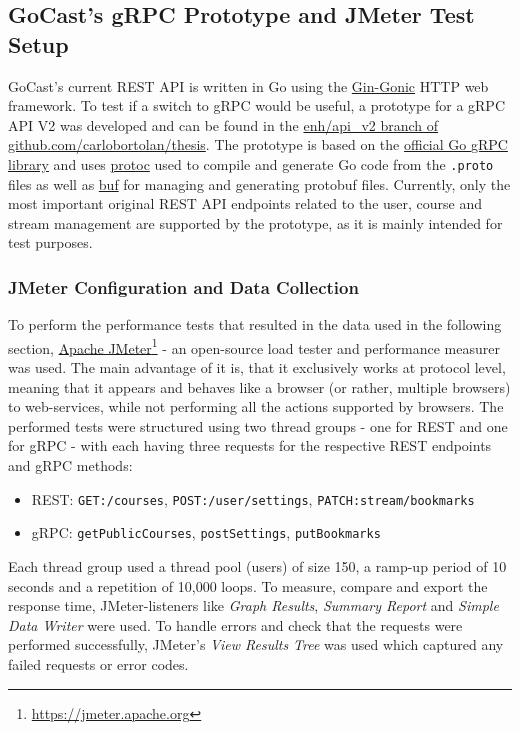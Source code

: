 \subsection{GoCast's gRPC Prototype and JMeter Test Setup}

GoCast's current \ac{REST} \ac{API} is written in Go using the \href{https://github.com/gin-gonic/gin}{Gin-Gonic} HTTP web framework. To test if a switch to \ac{gRPC} would be useful, a prototype for a \ac{gRPC} \ac{API} V2 was developed and can be found in the \href{https://github.com/carlobortolan/thesis/tree/enh/api\_v2}{enh/api\_v2 branch of github.com/carlobortolan/thesis}.
The prototype is based on the \href{https://google.golang.org/gprc}{official Go \ac{gRPC} library} and uses \href{https://github.com/protocolbuffers/protobuf}{protoc} used to compile and generate Go code from the \texttt{.proto} files as well as \href{https://github.com/bufbuild/buf}{buf} for managing and generating protobuf files. Currently, only the most important original \ac{REST} \ac{API} endpoints related to the user, course and stream management are supported by the prototype, as it is mainly intended for test purposes.

\subsubsection{JMeter Configuration and Data Collection}

To perform the performance tests that resulted in the data used in the following section, \href{https://jmeter.apache.org}{Apache JMeter}\footnote{\url{https://jmeter.apache.org}} - an open-source load tester and performance measurer was used. The main advantage of it is, that it exclusively works at protocol level, meaning that it appears and behaves like a browser (or rather, multiple browsers) to web-services, while not performing all the actions supported by browsers. The performed tests were structured using two thread groups - one for \ac{REST} and one for \ac{gRPC} - with each having three requests for the respective \ac{REST} endpoints and \ac{gRPC} methods:
\begin{itemize}
    \item \ac{REST}: \texttt{GET:/courses}, \texttt{POST:/user/settings}, \texttt{PATCH:stream/bookmarks}
    \item \ac{gRPC}: \texttt{getPublicCourses}, \texttt{postSettings}, \texttt{putBookmarks}
\end{itemize}
\break
Each thread group used a thread pool (users) of size 150, a ramp-up period of 10 seconds and a repetition of 10,000 loops.
To measure, compare and export the response time, JMeter-listeners like \textit{Graph Results}, \textit{Summary Report} and \textit{Simple Data Writer} were used. To handle errors and check that the requests were performed successfully, JMeter’s \textit{View Results Tree} was used which captured any failed requests or error codes.

